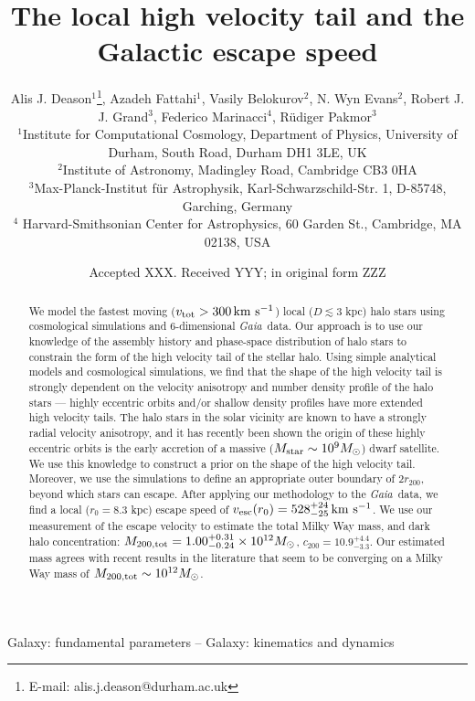 \documentclass[fleqn,usenatbib]{mnras}
\title[Galactic escape speed]{The local high velocity tail and the Galactic escape speed}
\author[A. J. Deason et al.]{
Alis J. Deason$^{1}$\thanks{E-mail: alis.j.deason@durham.ac.uk},
Azadeh Fattahi$^{1}$,
Vasily Belokurov$^{2}$,
N. Wyn Evans$^{2}$, \newauthor
Robert J. J. Grand$^{3}$,
Federico Marinacci$^{4}$,
R{\"u}diger Pakmor$^{3}$
\\
$^{1}$Institute for Computational Cosmology, Department of Physics, University of Durham, South Road, Durham DH1 3LE, UK\\
$^{2}$Institute of Astronomy, Madingley Road, Cambridge CB3 0HA\\
$^{3}$Max-Planck-Institut f{\"u}r Astrophysik, Karl-Schwarzschild-Str. 1, D-85748, Garching, Germany\\
$^{4}$ Harvard-Smithsonian Center for Astrophysics, 60 Garden St., Cambridge, MA 02138, USA 
}
\date{Accepted XXX. Received YYY; in original form ZZZ}
\newcommand{\kms}        {\,{\rm km}\,\,{\rm s}^{-1}}
\newcommand{\gaia}		{\emph{Gaia}}
\begin{document}
\label{firstpage}
\pagerange{\pageref{firstpage}--\pageref{lastpage}}
\maketitle

\begin{abstract}
We model the fastest moving ($v_{\rm tot} > 300 \kms$) local ($D \lesssim 3$ kpc) halo stars using cosmological simulations and 6-dimensional \gaia\ data. Our approach is to use our knowledge of the assembly history and phase-space distribution of halo stars to constrain the form of the high velocity tail of the stellar halo. Using simple analytical models and cosmological simulations, we find that the shape of the high velocity tail is strongly dependent on the velocity anisotropy and number density profile of the halo stars --- highly eccentric orbits and/or shallow density profiles have more extended high velocity tails. The halo stars in the solar vicinity are known to have a strongly radial velocity anisotropy, and it has recently been shown the origin of these highly eccentric orbits is the early accretion of a massive ($M_{\rm star}\sim 10^9 M_\odot$) dwarf satellite. We use this knowledge to construct a prior on the shape of the high velocity tail. Moreover, we use the simulations to define an appropriate outer boundary of $2r_{200}$, beyond which stars can escape.  After applying our methodology to the \gaia\ data, we find a local ($r_0=8.3$ kpc) escape speed of $v_{\rm esc}(r_0) = 528^{+24}_{-25} \kms$. We use our measurement of the escape velocity to estimate the total Milky Way mass, and dark halo concentration: $M_{200, \rm tot} = 1.00^{+0.31}_{-0.24} \times 10^{12}M_\odot$, $c_{200}=10.9^{+4.4}_{-3.3}$. Our estimated mass agrees with recent results in the literature that seem to be converging on a Milky Way mass of $M_{200, \rm tot} \sim 10^{12}M_\odot$.

\end{abstract}

\begin{keywords}
Galaxy: fundamental parameters -- Galaxy: kinematics and dynamics
\end{keywords}
\end{document}
